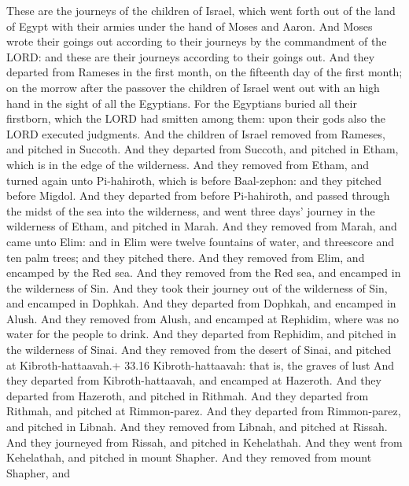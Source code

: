  These are the journeys of the children of Israel, which
went forth out of the land of Egypt with their armies under the hand of
Moses and Aaron.  And Moses wrote their goings out according
to their journeys by the commandment of the LORD: and these are their
journeys according to their goings out.  And they departed
from Rameses in the first month, on the fifteenth day of the first
month; on the morrow after the passover the children of Israel went out
with an high hand in the sight of all the Egyptians.  For
the Egyptians buried all their firstborn, which the LORD had smitten
among them: upon their gods also the LORD executed judgments.
 And the children of Israel removed from Rameses, and
pitched in Succoth.  And they departed from Succoth, and
pitched in Etham, which is in the edge of the wilderness. 
And they removed from Etham, and turned again unto Pi-hahiroth, which is
before Baal-zephon: and they pitched before Migdol.  And
they departed from before Pi-hahiroth, and passed through the midst of
the sea into the wilderness, and went three days' journey in the
wilderness of Etham, and pitched in Marah.  And they removed
from Marah, and came unto Elim: and in Elim were twelve fountains of
water, and threescore and ten palm trees; and they pitched there.
 And they removed from Elim, and encamped by the Red sea.
 And they removed from the Red sea, and encamped in the
wilderness of Sin.  And they took their journey out of the
wilderness of Sin, and encamped in Dophkah.  And they
departed from Dophkah, and encamped in Alush.  And they
removed from Alush, and encamped at Rephidim, where was no water for the
people to drink.  And they departed from Rephidim, and
pitched in the wilderness of Sinai.  And they removed from
the desert of Sinai, and pitched at Kibroth-hattaavah.+ 33.16
Kibroth-hattaavah: that is, the graves of lust  And they
departed from Kibroth-hattaavah, and encamped at Hazeroth. 
And they departed from Hazeroth, and pitched in Rithmah. 
And they departed from Rithmah, and pitched at Rimmon-parez.
 And they departed from Rimmon-parez, and pitched in
Libnah.  And they removed from Libnah, and pitched at
Rissah.  And they journeyed from Rissah, and pitched in
Kehelathah.  And they went from Kehelathah, and pitched in
mount Shapher.  And they removed from mount Shapher, and
